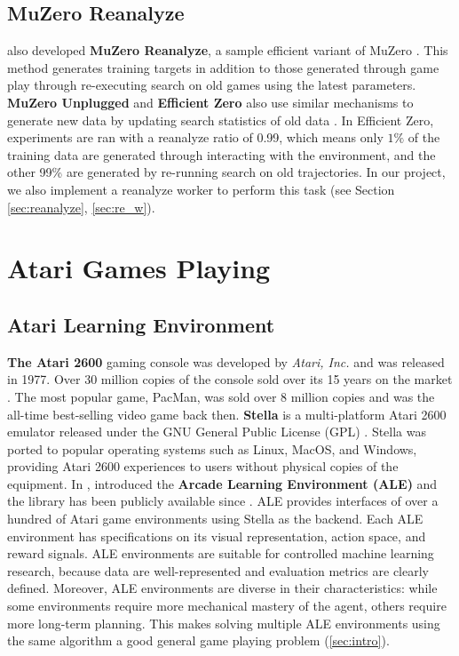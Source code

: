 \subsection{MuZero Reanalyze} \label{sec:muzero_reanalyze}
\citeauthor{MasteringAtariGo_Schrittwieser.Antonoglou.ea_2020} also developed \textbf{MuZero Reanalyze}, a sample efficient variant of MuZero \cite{MasteringAtariGo_Schrittwieser.Antonoglou.ea_2020}.
This method generates training targets in addition to those generated through game play through re-executing search on old games using the latest parameters.
\textbf{MuZero Unplugged} and \textbf{Efficient Zero} also use similar mechanisms to generate new data by updating search statistics of old data \cite{OnlineOfflineReinforcement_Schrittwieser.Hubert.ea_2021}.
In Efficient Zero, experiments are ran with a reanalyze ratio of 0.99, which means only $1\%$ of the training data are generated through interacting with the environment, and the other 99\% are generated by re-running search on old trajectories.
In our project, we also implement a reanalyze worker to perform this task (see Section \ref{sec:reanalyze}, \ref{sec:re_w}).

\section{Atari Games Playing}
\subsection{Atari Learning Environment} \label{sec:ale}
\textbf{The Atari 2600} gaming console was developed by \textit{Atari, Inc.} and was released in 1977.
Over 30 million copies of the console sold over its 15 years on the market \cite{Atari2600__2022}.
The most popular game, PacMan, was sold over 8 million copies and was the all-time best-selling video game back then.
\textbf{Stella} is a multi-platform Atari 2600 emulator released under the GNU General Public License (GPL) \cite{StellaMultiPlatformAtari__}.
Stella was ported to popular operating systems such as Linux, MacOS, and Windows, providing Atari 2600 experiences to users without physical copies of the equipment.
In \citeyear{ArcadeLearningEnvironment_Bellemare.Naddaf.ea_2013}, \citeauthor{ArcadeLearningEnvironment_Bellemare.Naddaf.ea_2013} introduced the \textbf{Arcade Learning Environment (ALE)} and the library has been publicly available since \cite{ArcadeLearningEnvironment_Bellemare.Naddaf.ea_2013}.
ALE provides interfaces of over a hundred of Atari game environments using Stella as the backend.
Each ALE environment has specifications on its visual representation, action space, and reward signals.
ALE environments are suitable for controlled machine learning research,
because data are well-represented and evaluation metrics are clearly defined.
Moreover, ALE environments are diverse in their characteristics: while some environments require more mechanical mastery of the agent, others require more long-term planning.
This makes solving multiple ALE environments using the same algorithm a good general game playing problem (\ref{sec:intro}).

